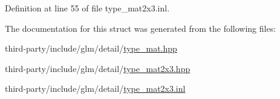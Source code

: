 Definition at line 55 of file type\+\_\+mat2x3.\+inl.



The documentation for this struct was generated from the following files\+:\begin{DoxyCompactItemize}
\item 
third-\/party/include/glm/detail/\hyperlink{type__mat_8hpp}{type\+\_\+mat.\+hpp}\item 
third-\/party/include/glm/detail/\hyperlink{type__mat2x3_8hpp}{type\+\_\+mat2x3.\+hpp}\item 
third-\/party/include/glm/detail/\hyperlink{type__mat2x3_8inl}{type\+\_\+mat2x3.\+inl}\end{DoxyCompactItemize}
